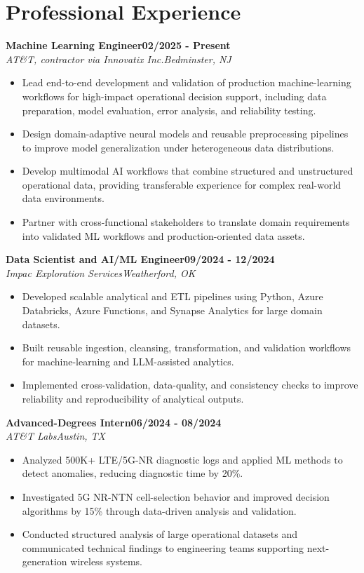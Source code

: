 \documentclass[9pt,letterpaper]{extarticle}
\newcommand{\role}[4]{%
  \Needspace{4\baselineskip}\textbf{#1}\hfill\textbf{#2}\\[-1pt]
  \textit{#3}\hfill\textit{#4}\par}
\begin{document}
\section{Professional Experience}
\role{Machine Learning Engineer}{02/2025 - Present}{AT\&T, contractor via Innovatix Inc.}{Bedminster, NJ}
\begin{itemize}
\item Lead end-to-end development and validation of production machine-learning workflows for high-impact operational decision support, including data preparation, model evaluation, error analysis, and reliability testing.
\item Design domain-adaptive neural models and reusable preprocessing pipelines to improve model generalization under heterogeneous data distributions.
\item Develop multimodal AI workflows that combine structured and unstructured operational data, providing transferable experience for complex real-world data environments.
\item Partner with cross-functional stakeholders to translate domain requirements into validated ML workflows and production-oriented data assets.
\end{itemize}
\role{Data Scientist and AI/ML Engineer}{09/2024 - 12/2024}{Impac Exploration Services}{Weatherford, OK}
\begin{itemize}
\item Developed scalable analytical and ETL pipelines using Python, Azure Databricks, Azure Functions, and Synapse Analytics for large domain datasets.
\item Built reusable ingestion, cleansing, transformation, and validation workflows for machine-learning and LLM-assisted analytics.
\item Implemented cross-validation, data-quality, and consistency checks to improve reliability and reproducibility of analytical outputs.
\end{itemize}
\role{Advanced-Degrees Intern}{06/2024 - 08/2024}{AT\&T Labs}{Austin, TX}
\begin{itemize}
\item Analyzed 500K+ LTE/5G-NR diagnostic logs and applied ML methods to detect anomalies, reducing diagnostic time by 20\%.
\item Investigated 5G NR-NTN cell-selection behavior and improved decision algorithms by 15\% through data-driven analysis and validation.
\item Conducted structured analysis of large operational datasets and communicated technical findings to engineering teams supporting next-generation wireless systems.
\end{itemize}
\end{document}
